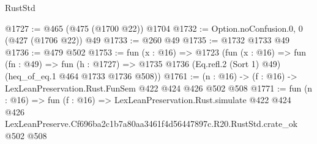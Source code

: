 \begin{lexlean}{RustStd}
\begin{coremodule}
@1727 := @465 (@475 (@1700 @22)) @1704
@1732 := Option.noConfusion.{0, 0} (@427 (@1706 @22)) @49
@1733 := @260 @49
@1735 := @1732 @1733 @49
@1736 := @479 @502
@1753 := fun (x : @16) =>
  @1723
    (fun (x : @16) =>
    fun (fn : @49) =>
    fun (h : @1727) => @1735 @1736 (Eq.refl.{2} (Sort 1) @49) (heq_of_eq.{1} @464 @1733 @1736 @508))
@1761 := (n : @16) -> (f : @16) -> LexLeanPreservation.Rust.FunSem @422 @424 @426 @502 @508
@1771 := fun (n : @16) =>
  fun (f : @16) =>
  LexLeanPreservation.Rust.simulate
    @422
    @424
    @426
    LexLeanPreserve.Cf696ba2c1b7a80aa3461f4d56447897c.R20.RustStd.crate_ok
    @502
    @508
\end{coremodule}
\end{lexlean}
